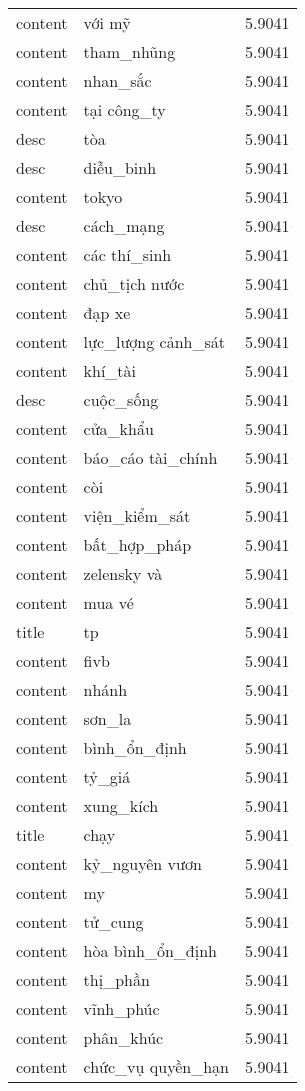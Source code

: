 \documentclass{article}
\begin{document}
\begin{tabular}{lll}
content & với mỹ & 5.9041\\
content & tham\_nhũng & 5.9041\\
content & nhan\_sắc & 5.9041\\
content & tại công\_ty & 5.9041\\
desc & tòa & 5.9041\\
desc & diễu\_binh & 5.9041\\
content & tokyo & 5.9041\\
desc & cách\_mạng & 5.9041\\
content & các thí\_sinh & 5.9041\\
content & chủ\_tịch nước & 5.9041\\
content & đạp xe & 5.9041\\
content & lực\_lượng cảnh\_sát & 5.9041\\
content & khí\_tài & 5.9041\\
desc & cuộc\_sống & 5.9041\\
content & cửa\_khẩu & 5.9041\\
content & báo\_cáo tài\_chính & 5.9041\\
content & còi & 5.9041\\
content & viện\_kiểm\_sát & 5.9041\\
content & bất\_hợp\_pháp & 5.9041\\
content & zelensky và & 5.9041\\
content & mua vé & 5.9041\\
title & tp & 5.9041\\
content & fivb & 5.9041\\
content & nhánh & 5.9041\\
content & sơn\_la & 5.9041\\
content & bình\_ổn\_định & 5.9041\\
content & tỷ\_giá & 5.9041\\
content & xung\_kích & 5.9041\\
title & chạy & 5.9041\\
content & kỷ\_nguyên vươn & 5.9041\\
content & my & 5.9041\\
content & tử\_cung & 5.9041\\
content & hòa bình\_ổn\_định & 5.9041\\
content & thị\_phần & 5.9041\\
content & vĩnh\_phúc & 5.9041\\
content & phân\_khúc & 5.9041\\
content & chức\_vụ quyền\_hạn & 5.9041\\

\end{tabular}
\end{document}
